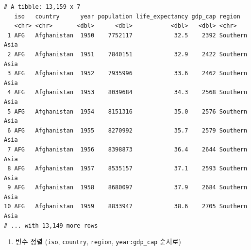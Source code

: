 \documentclass[
  11pt,
]{krantz}
\newenvironment{Shaded}{\begin{snugshade}}{\end{snugshade}}
\newcommand{\DataTypeTok}[1]{\textcolor[rgb]{0.27,0.27,0.27}{#1}}
\newcommand{\KeywordTok}[1]{\textcolor[rgb]{0.27,0.27,0.27}{\textbf{#1}}}
\newcommand{\NormalTok}[1]{#1}
\newcommand{\OperatorTok}[1]{\textcolor[rgb]{0.43,0.43,0.43}{\textbf{#1}}}
\newcommand{\StringTok}[1]{\textcolor[rgb]{0.5,0.5,0.5}{#1}}
\providecommand{\tightlist}{%
  \setlength{\itemsep}{0pt}\setlength{\parskip}{0pt}}
\begin{document}
\footnotesize

\begin{Shaded}
\end{Shaded}

\begin{verbatim}
# A tibble: 13,159 x 7
   iso   country      year population life_expectancy gdp_cap region       
   <chr> <chr>       <dbl>      <dbl>           <dbl>   <dbl> <chr>        
 1 AFG   Afghanistan  1950    7752117            32.5    2392 Southern Asia
 2 AFG   Afghanistan  1951    7840151            32.9    2422 Southern Asia
 3 AFG   Afghanistan  1952    7935996            33.6    2462 Southern Asia
 4 AFG   Afghanistan  1953    8039684            34.3    2568 Southern Asia
 5 AFG   Afghanistan  1954    8151316            35.0    2576 Southern Asia
 6 AFG   Afghanistan  1955    8270992            35.7    2579 Southern Asia
 7 AFG   Afghanistan  1956    8398873            36.4    2644 Southern Asia
 8 AFG   Afghanistan  1957    8535157            37.1    2593 Southern Asia
 9 AFG   Afghanistan  1958    8680097            37.9    2684 Southern Asia
10 AFG   Afghanistan  1959    8833947            38.6    2705 Southern Asia
# ... with 13,149 more rows
\end{verbatim}

\normalsize

\begin{enumerate}
\def\labelenumi{\arabic{enumi}.}
\setcounter{enumi}{5}
\tightlist
\item
  변수 정렬 (\texttt{iso}, \texttt{country}, \texttt{region}, \texttt{year:gdp\_cap} 순서로)
\end{enumerate}

\footnotesize

\begin{Shaded}
\end{Shaded}
\end{document}
